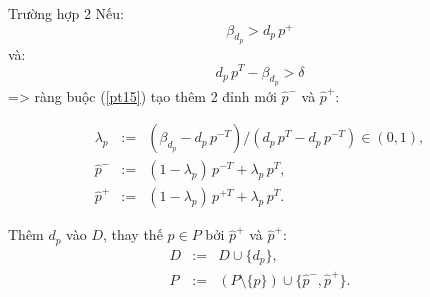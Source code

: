 \documentclass[11pt]{beamer}
\theoremstyle{definition}
\theoremstyle{plain}
\theoremstyle{plain}
\theoremstyle{remark}
\begin{document}
	\begin{frame}{Trường hợp 2}
		 Nếu:
		\begin{equation}\label{betagreater}
			\beta_{d_p} > d_p\, p^+
		\end{equation}
		và:
		\begin{equation}\label{greaterdelta}
			d_{p}\, p^T - \beta_{d_{p}} > \delta
		\end{equation}
		=> ràng buộc (\ref{pt15}) tạo thêm 2 đỉnh mới $\hat p^-$ và $\hat p^+$:
	
			\begin{equation}\label{def_hatp}
				\begin{array}{lcl}
					\lambda_p &:=& (\beta_{d_p} - d_p\, p^{-T})/(d_p\, p^T - d_p\, p^{-T}) \in (0, 1), \\
					\hat p^- &:=& (1 - \lambda_p)\, p^{-T} + \lambda_p\, p^T, \\
					\hat p^+ &:=& (1 - \lambda_p)\, p^{+T} + \lambda_p\, p^T.
				\end{array}
			\end{equation}
		
	\end{frame}
	
	\begin{frame}
		Thêm $d_p$ vào $D$, thay thế $p \in P$ bởi $\hat p^+$ và $\hat p^+$:
		\begin{equation}\label{newDP1}
			\begin{array}{lcl}
				D &:=& D \cup \{d_{p}\}, \\
				P &:=&(P \setminus \{p\}) \cup \{\hat p^-, \hat p^+\}.
			\end{array}
		\end{equation}
		
	\end{frame}
	
\end{document}
